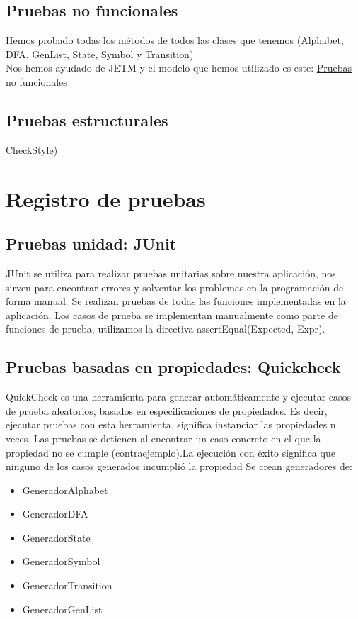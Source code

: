 \documentclass[DIV=calc,paper=a4,fontsize=11pt,onecolumn]{scrartcl} %
\begin{document}
\subsection{Pruebas no funcionales}
Hemos probado todas los métodos de todos las clases que tenemos (Alphabet, DFA, GenList, State, Symbol y Transition) \\

Nos hemos ayudado de JETM y el modelo que hemos utilizado es este: 
\href{Informes/documentoRendimiento.txt}{Pruebas no funcionales} \\

\subsection{Pruebas estructurales}
\href{http://checkstyle.sourceforge.net/}{CheckStyle})

	\section{Registro de pruebas}
	\subsection{Pruebas unidad: JUnit}
	JUnit se utiliza para realizar pruebas unitarias sobre nuestra aplicación, nos sirven para encontrar errores y solventar los problemas en la programación de forma manual.
	Se realizan pruebas de todas las funciones implementadas en la aplicación.
	Los casos de prueba se implementan manualmente como parte de funciones de prueba, utilizamos la directiva assertEqual(Expected, Expr).
	\subsection{Pruebas basadas en propiedades: Quickcheck}
	QuickCheck es una  herramienta para generar automáticamente y ejecutar casos de prueba aleatorios, basados en especificaciones de propiedades. Es decir, ejecutar pruebas con esta herramienta, significa instanciar las propiedades n veces. Las pruebas se detienen al encontrar un caso concreto en el que la propiedad no se cumple
	(contraejemplo).La ejecución con éxito significa que ninguno de los casos generados incumplió la propiedad
	Se crean generadores de:
	\begin{itemize}
		\item GeneradorAlphabet
		\item GeneradorDFA
		\item GeneradorState
		\item GeneradorSymbol
		\item GeneradorTransition
		\item GeneradorGenList
	\end{itemize}
	
\end{document}

